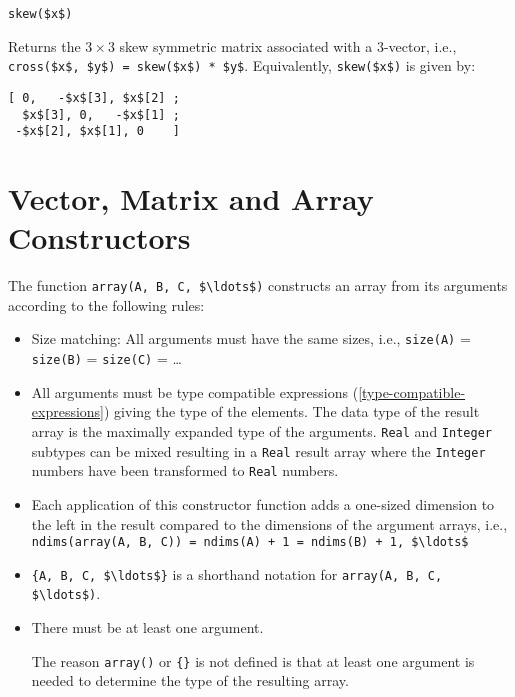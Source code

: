 \begin{functiondefinition}[skew]
\begin{synopsis}\begin{lstlisting}
skew($x$)
\end{lstlisting}\end{synopsis}
\begin{semantics}
Returns the $3 \times 3$ skew symmetric matrix associated with a 3-vector, i.e., \lstinline!cross($x$, $y$) = skew($x$) * $y$!.  Equivalently, \lstinline!skew($x$)! is given by:
\begin{lstlisting}[frame=none]
[ 0,   -$x$[3], $x$[2] ;
  $x$[3], 0,   -$x$[1] ;
 -$x$[2], $x$[1], 0    ]
\end{lstlisting}
\end{semantics}
\end{functiondefinition}

\section{Vector, Matrix and Array Constructors}\label{vector-matrix-and-array-constructors}

The  function \lstinline!array(A, B, C, $\ldots$)! constructs an array from its arguments according to the following rules:
\begin{itemize}
\item
  Size matching: All arguments must have the same sizes, i.e.,
  \lstinline!size(A)! = \lstinline!size(B)! = \lstinline!size(C)! = \ldots
\item
  All arguments must be type compatible expressions (\cref{type-compatible-expressions}) giving the type of the elements.  The data type of the result array is the
  maximally expanded type of the arguments. \lstinline!Real! and \lstinline!Integer! subtypes can be mixed resulting in a \lstinline!Real! result array where the
  \lstinline!Integer! numbers have been transformed to \lstinline!Real! numbers.
\item
  Each application of this constructor function adds a one-sized dimension to the left in the result compared to the dimensions of the argument arrays, i.e.,
  \lstinline!ndims(array(A, B, C)) = ndims(A) + 1 = ndims(B) + 1, $\ldots$!
\item
  \lstinline!{A, B, C, $\ldots$}! is a shorthand notation for \lstinline!array(A, B, C, $\ldots$)!.
\item
  There must be at least one argument.
  \begin{nonnormative}
  The reason \lstinline!array()! or \lstinline!{}! is not defined is that at least one argument is needed to determine the type of the resulting array.
  \end{nonnormative}
\end{itemize}

